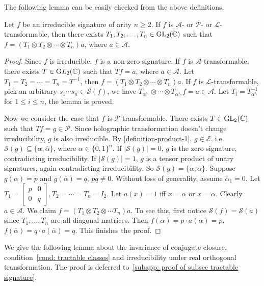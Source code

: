 The following lemma can be easily checked from the above definitions.
\begin{lemma}\label{lm: APL-transformable}
    Let $f$ be an irreducible signature of arity $n\ge 2$.
    If $f$ is $\mathscr{A}$- or $\mathscr{P}$- or $\mathscr{L}$-transformable, then there exists $T_1,T_2,\ldots,T_n\in \mathrm{GL}_2(\mathbb{C})$ such that $f=(T_1\otimes T_2\otimes \cdots \otimes T_n)a$, where $a\in \mathscr{A}.$
\end{lemma}
\begin{proof}
    Since $f$ is irreducible, $f$ is a non-zero signature.
    If $f$ is $\mathscr{A}$-transformable, there exists $T\in \mathrm
    GL_2(\mathbb{C})$ such that $Tf=a$, where $a\in \mathscr{A}$.
    Let $T_1=T_2=\cdots=T_n=T^{-1}$, then $f=(T_1\otimes T_2 \otimes \cdots \otimes T_n)a.$
    If $f$ is $\mathscr{L}$-transformable, pick an arbitrary $s_1\cdots s_n\in \mathscr{S}(f)$, we have $T_{\alpha^{s_1}}\otimes\cdots \otimes T_{\alpha^{s_n}}f=a\in\mathscr{A}.$
    Let $T_i=T_{\alpha^{s_i}}^{-1}$ for $1\le i\le n$, the lemma is proved.

    Now we consider the case that $f$ is $\mathscr{P}$-transformable.
    There exists $T\in \mathrm{GL}_2(\mathbb{C})$ such that $Tf=g\in \mathscr{P}.$
    Since holographic transformation doesn't change irreducibility, $g$ is also irreducible.
    By \cref{definition-product-1}, $g\in \mathcal{E}$.
    i.e. $\mathscr{S}(g)\subseteq \{\alpha,\overline{\alpha}\}$, where $\alpha\in \{0,1\}^n$.
    If $|\mathscr{S}(g)|=0$, $g$ is the zero signature, contradicting irreducibility.
    If $|\mathscr{S}(g)|=1$, $g$ is a tensor product of unary signatures, again contradicting irreducibility.
    So $\mathscr{S}(g)=\{\alpha,\overline{\alpha}\}.$
    Suppose $g(\alpha)=p$ and $g(\overline{\alpha})=q$, $pq\neq 0.$
    Without loss of generality, assume $\alpha_1=0.$
    Let $T_1=\left[\begin{smallmatrix}
        p & 0\\
        0 & q
    \end{smallmatrix}\right],T_2=\cdots=T_n=I_2.$
    Let $a(x)=1$ iff $x=\alpha$ or $x=\overline{\alpha}.$
    Clearly $a\in \mathscr{A}.$
    We claim $f=(T_1\otimes T_2\otimes \cdots T_n)a.$
    To see this,
    first notice $\mathscr{S}(f)=\mathscr{S}(a)$ since $T_1,\ldots, T_n$ are all diagonal matrices.
    Then $f(\alpha)=p\cdot a(\alpha)=p$, $f(\overline{\alpha})=q\cdot a(\overline{\alpha})=q.$
    This finishes the proof.
\end{proof}

We give the following lemma about the invariance of conjugate closure, condition~\eqref{cond: tractable classes} and irreducibility under real orthogonal transformation.
The proof is deferred to~\autoref{subapp: proof of subsec tractable signature}.


